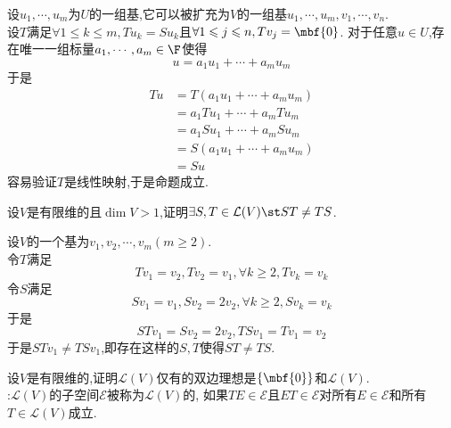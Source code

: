 \documentclass{ctexart}
\begin{document}
\begin{solution}[Proof.]
    设$u_1,\cdots,u_m$为$U$的一组基,它可以被扩充为$V$的一组基$u_1,\cdots,u_m,v_1,\cdots,v_n$.\\
    设$T$满足$\forall 1\leqslant k\leqslant m,Tu_k=Su_k$且$\forall 1\leqslant j\leqslant n,Tv_j=\mbf{0}$.
    对于任意$u\in U$,存在唯一一组标量$a_1,\cdots,a_m\in\F$使得
    $$u=a_1u_1+\cdots+a_mu_m$$
    于是$$\begin{aligned}
        Tu
        &= T\left(a_1u_1+\cdots+a_mu_m\right) \\
        &= a_1Tu_1+\cdots+a_mTu_m \\
        &= a_1Su_1+\cdots+a_mSu_m \\
        &= S\left(a_1u_1+\cdots+a_mu_m\right) \\
        &= Su
    \end{aligned}$$
    容易验证$T$是线性映射,于是命题成立.
\end{solution}
\begin{problem}[Example 4.]
    设$V$是有限维的且$\dim V>1$,证明$\exists S,T\in\mathcal{L}(V)\st ST\neq TS$.
\end{problem}
\begin{solution}[Proof.]
    设$V$的一个基为$v_1,v_2,\cdots,v_m(m\geqslant 2)$.\\
    令$T$满足$$Tv_1=v_2,Tv_2=v_1,\forall k\geqslant 2,Tv_k=v_k$$
    令$S$满足$$Sv_1=v_1,Sv_2=2v_2,\forall k\geqslant 2,Sv_k=v_k$$
    于是$$STv_1=Sv_2=2v_2,TSv_1=Tv_1=v_2$$
    于是$STv_1\neq TSv_1$,即存在这样的$S,T$使得$ST\neq TS$.
\end{solution}
\begin{problem}[Example 5.]
    设$V$是有限维的,证明$\mathcal{L}(V)$仅有的双边理想是$\left\{\mbf{0}\right\}$和$\mathcal{L}(V)$.\\
    :$\mathcal{L}(V)$的子空间$\mathcal{E}$被称为$\mathcal{L}(V)$的,
    如果$TE\in\mathcal{E}$且$ET\in\mathcal{E}$对所有$E\in\mathcal{E}$和所有$T\in\mathcal{L}(V)$成立.
\end{problem}
\end{document}
